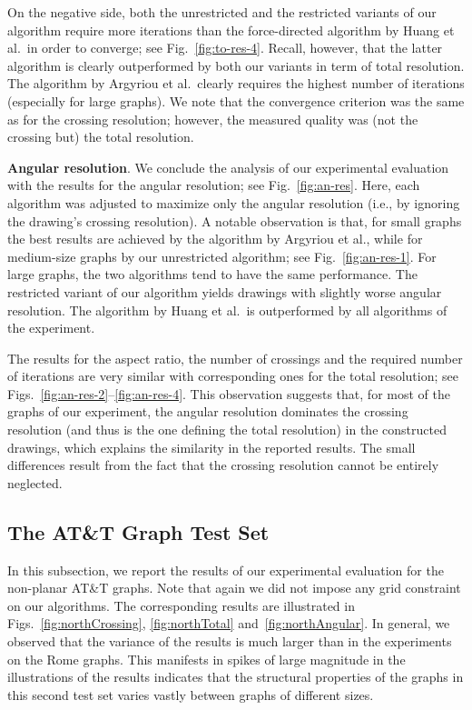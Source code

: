 \documentclass{comjnl}
\newcommand{\myparagraph}[1]{\medskip\noindent\textbf{#1}.}
\begin{document}
On the negative side, both the unrestricted and the restricted variants of our algorithm require more iterations than the force-directed algorithm by Huang et al.\ in order to converge; see Fig.~\ref{fig:to-res-4}. Recall, however, that the latter algorithm is clearly outperformed by both our variants in term of total resolution. The algorithm by Argyriou et al.\ clearly requires the highest number of iterations (especially for large graphs). We note that the convergence criterion was the same as for the crossing resolution; however, the measured quality was (not the crossing but) the total resolution.

\myparagraph{Angular resolution} We conclude the analysis of our experimental evaluation with the results for the angular resolution; see Fig.~\ref{fig:an-res}. Here, each algorithm was adjusted  to maximize only the angular resolution (i.e., by ignoring the drawing's crossing resolution). A notable observation is that, for small graphs the best results are achieved by the algorithm by Argyriou et al., while for medium-size graphs by our unrestricted algorithm; see Fig.~\ref{fig:an-res-1}. For large graphs, the two algorithms tend to have the same performance. The restricted variant of our algorithm yields drawings with slightly worse angular resolution. The algorithm by Huang et al.\ is outperformed by all algorithms of the experiment.

The results for the aspect ratio, the number of crossings and the required number of iterations are very similar with corresponding ones for the total resolution; see Figs.~\ref{fig:an-res-2}--\ref{fig:an-res-4}. This observation suggests that, for most of the graphs of our experiment, the angular resolution dominates the crossing resolution (and thus is the one defining the total resolution) in the constructed drawings, which explains the similarity in the reported results. The small differences result from the fact that the crossing resolution cannot be entirely neglected.

\subsection{The AT\&T  Graph Test Set}
\label{ssec:north}

In this subsection, we report the results of our experimental evaluation for the non-planar AT\&T graphs. Note that again we did not impose any grid constraint on our algorithms. The corresponding results are illustrated in Figs.~\ref{fig:northCrossing}, \ref{fig:northTotal} and~\ref{fig:northAngular}. In general, we observed that the variance of the results is much larger than in the experiments on the Rome graphs. This manifests in spikes of large magnitude in the illustrations of the results indicates that the structural properties of the graphs in this second test set varies vastly between graphs of different sizes.
\end{document}
